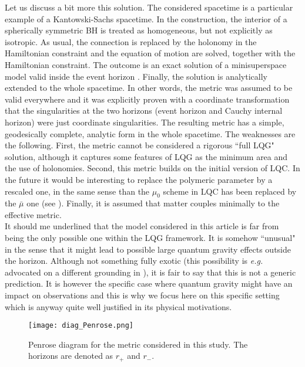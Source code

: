 \documentclass[twocolumn,amsmath,amssymb,prl,10pt,nofootinbib,superscriptaddress]{revtex4}
\begin{document}
Let us discuss a bit more this solution. The considered spacetime is a particular example of a Kantowski-Sachs spacetime. In the construction, the interior of a spherically symmetric BH is treated as homogeneous, but not explicitly as isotropic. As usual, the connection is replaced by the holonomy in the Hamiltonian constraint and the equation of motion are solved, together with the Hamiltonian constraint.  The outcome is an exact solution of a minisuperspace model valid inside the event horizon  \cite{Modesto:2008im}. Finally, the solution is analytically extended to the whole spacetime. In other words, the metric was assumed to be valid everywhere and it was explicitly proven with a coordinate transformation that the singularities at the two horizons (event horizon and Cauchy internal horizon) were just coordinate singularities. The resulting metric has a simple, geodesically complete, analytic form in the whole spacetime. The weaknesses are the following. First, the metric cannot be considered a rigorous ``full LQG" solution, although it captures some features of LQG as the minimum area and the use of holonomies. Second, this metric builds on the initial version of LQC. In the future it would be interesting to replace the polymeric parameter by a rescaled one, in the same sense than the $\mu_0$ scheme in LQC has been replaced by the $\bar{\mu}$ one (see \cite{lqc9}). Finally, it is assumed that matter couples minimally to the effective metric.\\

It should me underlined that the model considered in this article is far from being the only possible one within the LQG framework. It is somehow ``unusual" in the sense that it might lead to possible large quantum gravity effects outside the horizon. Although not something fully exotic (this possibility is {\it e.g.} advocated on a different grounding in \cite{Haggard:2016ibp}), it is fair to say that this is not a generic prediction. It is however the specific case where quantum gravity might have an impact on observations and this is why we focus here on this specific setting which is anyway quite well justified in its physical motivations. 

\begin{figure}
\centering
    \texttt{[image: diag\_Penrose.png]}  
 \caption{Penrose diagram for the metric considered in this study. The horizons are denoted as $r_+$ and $r_-$.}
      \label{penrose}

\end{figure}
\end{document}
